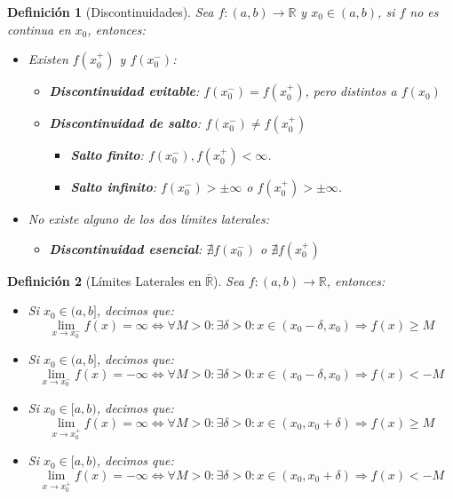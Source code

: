 \documentclass[10pt,a4paper,openright]{book}
\theoremstyle{break}
\newtheorem*{defi}{Definición}
\begin{document}
\begin{defi}[Discontinuidades]
Sea $f: (a,b)\longrightarrow \mathbb R$ y $x_0\in (a,b)$, si $f$ no es continua en $x_0$, entonces:
\begin{itemize}
\item Existen $f(x_0^+)$ y $f(x_0^-)$:
	\begin{itemize}
	\item \textbf{Discontinuidad evitable}: $f(x_0^-)=f(x_0^+)$, pero distintos a $f(x_0)$
	\item \textbf{Discontinuidad de salto}: $f(x_0^-)\neq f(x_0^+)$
		\begin{itemize}
		\item \textbf{Salto finito}: $f(x_0^-), f(x_0^+) < \infty$.
		\item \textbf{Salto infinito}: $f(x_0^-) > \pm\infty$ o $f(x_0^+) > \pm\infty$.
		\end{itemize}
	\end{itemize}
	
\item No existe alguno de los dos límites laterales:
	\begin{itemize}
	\item \textbf{Discontinuidad esencial}: $\nexists f(x_0^-)$ o $\nexists f(x_0^+)$
	\end{itemize}
\end{itemize}
\end{defi}

\begin{defi}[Límites Laterales en $\bar{\mathbb{R}}$]
Sea $f: (a,b)\longrightarrow \mathbb R$, entonces:
\begin{itemize}
\item Si $x_0\in (a,b]$, decimos que:
$$\lim_{x\rightarrow x_0^-}f(x)=\infty\Leftrightarrow \forall M>0: \exists \delta>0: x\in (x_0-\delta, x_0)\Rightarrow f(x)\geq M$$

\item Si $x_0\in (a,b]$, decimos que:
$$\lim_{x\rightarrow x_0^-}f(x)=-\infty\Leftrightarrow \forall M>0: \exists \delta>0: x\in (x_0-\delta, x_0)\Rightarrow f(x)< -M$$

\item Si $x_0\in [a,b)$, decimos que:
$$\lim_{x\rightarrow x_0^+}f(x)=\infty\Leftrightarrow \forall M>0: \exists \delta>0: x\in (x_0,x_0+\delta)\Rightarrow f(x)\geq M$$

\item Si $x_0\in [a,b)$, decimos que:
$$\lim_{x\rightarrow x_0^+}f(x)=-\infty\Leftrightarrow \forall M>0: \exists \delta>0: x\in (x_0,x_0+\delta)\Rightarrow f(x)< -M$$
\end{itemize}
\end{defi}
\end{document}
